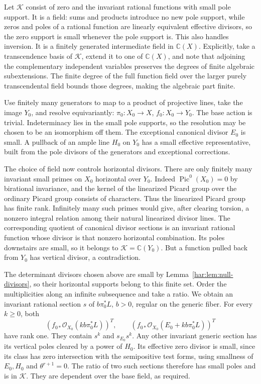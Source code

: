 Let \(\mathcal K\) consist of zero and the invariant rational functions
with small pole support. It is a field: sums and products introduce no
new pole support, while zeros and poles of a rational function are
linearly equivalent effective divisors, so the zero support is small
whenever the pole support is. This also handles inversion. It is a
finitely generated intermediate field in \(\mathbb C(X)\). Explicitly,
take a transcendence basis of \(\mathcal K\), extend it to one of
\(\mathbb C(X)\), and note that adjoining the complementary independent
variables preserves the degrees of finite algebraic subextensions.
The finite degree of the full function field over the larger purely
transcendental field bounds those degrees, making the algebraic part
finite.

Use finitely many generators to map to a product of projective lines,
take the image \(Y_0\), and resolve equivariantly:
\(\pi_0:X_0\to X\), \(f_0:X_0\to Y_0\). The base action is trivial.
Indeterminacy lies in the small pole supports, so the resolution may
be chosen to be an isomorphism off them. The exceptional canonical
divisor \(E_0\) is small. A pullback of an ample line \(H_0\) on
\(Y_0\) has a small effective representative, built from the pole
divisors of the generators and exceptional corrections.

The choice of field now controls horizontal divisors. There are only
finitely many invariant small primes on \(X_0\) horizontal over
\(Y_0\). Indeed \(\operatorname{Pic}^0(X_0)=0\) by birational
invariance, and the kernel of the linearized Picard group over the
ordinary Picard group consists of characters. Thus the linearized
Picard group has finite rank. Infinitely many such primes would give,
after clearing torsion, a nonzero integral relation among their
natural linearized divisor lines. The corresponding quotient of
canonical divisor sections is an invariant rational function whose
divisor is that nonzero horizontal combination. Its poles downstairs
are small, so it belongs to \(\mathcal K=\mathbb C(Y_0)\).
But a function pulled back from \(Y_0\) has vertical divisor, a
contradiction.

The determinant divisors chosen above are small by
Lemma~\ref{har:lem:null-divisors}, so their horizontal supports belong
to this finite set. Order
the multiplicities along an infinite subsequence and take a ratio.
We obtain an invariant rational section \(s\) of \(b\pi_0^*L\),
\(b>0\), regular on the generic fiber. For every \(k\ge0\), both
\[
 (f_{0*}\mathcal O_{X_0}(kb\pi_0^*L))^T,
 \qquad (f_{0*}\mathcal O_{X_0}(E_0+kb\pi_0^*L))^T
\]
have rank one. They contain \(s^k\) and \(s_{E_0}s^k\). Any other
invariant generic section has its vertical poles cleared by a power
of \(H_0\). Its effective zero divisor is small, since its class has
zero intersection with the semipositive test forms, using smallness of
\(E_0,H_0\) and \(\theta^{r+1}=0\).
The ratio of two such sections therefore has small poles and is in
\(\mathcal K\). They are dependent over the base field, as required.

